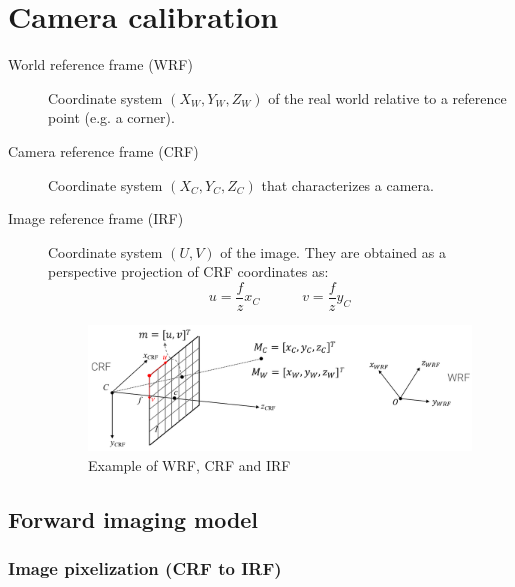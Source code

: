 \chapter{Camera calibration}

\begin{description}
    \item[World reference frame (WRF)] 
        Coordinate system $(X_W, Y_W, Z_W)$ of the real world relative to a reference point (e.g. a corner).

    \item[Camera reference frame (CRF)] 
        Coordinate system $(X_C, Y_C, Z_C)$ that characterizes a camera.

    \item[Image reference frame (IRF)] 
        Coordinate system $(U, V)$ of the image.
        They are obtained as a perspective projection of CRF coordinates as:
        \[ 
            u = \frac{f}{z}x_C 
            \hspace{3em} 
            v = \frac{f}{z}y_C 
        \]

    \begin{figure}[H]
        \centering
        \includegraphics[width=0.8\linewidth]{./img/_formation_system.pdf}
        \caption{Example of WRF, CRF and IRF}
    \end{figure}
\end{description}



\section{Forward imaging model}


\subsection{Image pixelization (CRF to IRF)}

